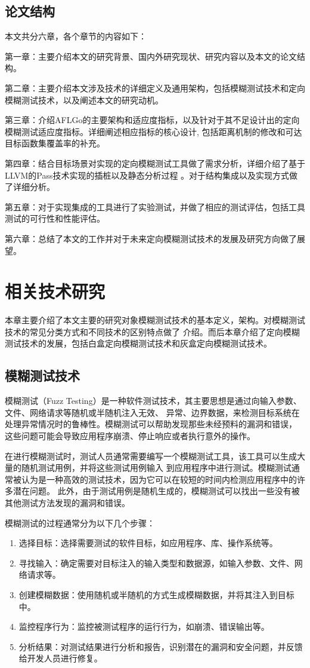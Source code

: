 \documentclass[bachelor]{njupthesis}
\begin{document}
\section{论文结构}
本文共分六章，各个章节的内容如下：

第一章：主要介绍本文的研究背景、国内外研究现状、研究内容以及本文的论文结构。

第二章：主要介绍本文涉及技术的详细定义及通用架构，包括模糊测试技术和定向模糊测试技术，以及阐述本文的研究动机。

第三章：介绍AFLGo的主要架构和适应度指标，以及针对于其不足设计出的定向模糊测试适应度指标。详细阐述相应指标的核心设计,
包括距离机制的修改和可达目标函数集覆盖率的补充。

第四章：结合目标场景对实现的定向模糊测试工具做了需求分析，详细介绍了基于LLVM的Pass技术实现的插桩以及静态分析过程
。对于结构集成以及实现方式做了详细分析。

第五章：对于实现集成的工具进行了实验测试，并做了相应的测试评估，包括工具测试的可行性和性能评估。

第六章：总结了本文的工作并对于未来定向模糊测试技术的发展及研究方向做了展望。

\chapter{相关技术研究}
本章主要介绍了本文主要的研究对象模糊测试技术的基本定义，架构。对模糊测试技术的常见分类方式和不同技术的区别特点做了
介绍。而后本章介绍了定向模糊测试技术的发展，包括白盒定向模糊测试技术和灰盒定向模糊测试技术。
\section{模糊测试技术}
模糊测试（Fuzz Testing）是一种软件测试技术，其主要思想是通过向输入参数、文件、网络请求等随机或半随机注入无效、
异常、边界数据，来检测目标系统在处理异常情况时的鲁棒性。模糊测试可以帮助发现那些未经预料的漏洞和错误，
这些问题可能会导致应用程序崩溃、停止响应或者执行意外的操作。

在进行模糊测试时，测试人员通常需要编写一个模糊测试工具，该工具可以生成大量的随机测试用例，并将这些测试用例输入
到应用程序中进行测试。模糊测试通常被认为是一种高效的测试技术，因为它可以在较短的时间内检测应用程序中的许多潜在问题。
此外，由于测试用例是随机生成的，模糊测试可以找出一些没有被其他测试方法发现的漏洞和错误。

模糊测试的过程通常分为以下几个步骤：

\begin{enumerate}[label=(\arabic*),leftmargin=48pt]
 	\item 选择目标：选择需要测试的软件目标，如应用程序、库、操作系统等。
	\item 寻找输入：确定需要对目标注入的输入类型和数据源，如输入参数、文件、网络请求等。
	\item 创建模糊数据：使用随机或半随机的方式生成模糊数据，并将其注入到目标中。
	\item 监控程序行为：监控被测试程序的运行行为，如崩溃、错误输出等。
	\item 分析结果：对测试结果进行分析和报告，识别潜在的漏洞和安全问题，并反馈给开发人员进行修复。
\end{enumerate}
\end{document}
